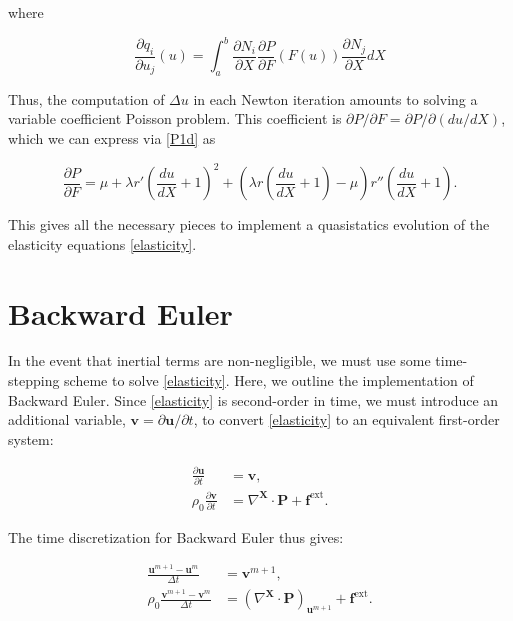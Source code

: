 \documentclass{article}
\begin{document}
where

\begin{equation}
\frac{\partial q_i}{\partial u_j} (u) = \int_a^b \frac{\partial N_i}{\partial X} \frac{\partial P}{\partial F} \left( F(u) \right) \frac{\partial N_j}{\partial X} dX
\end{equation}

Thus, the computation of \(\Delta u\) in each Newton iteration amounts to solving a variable coefficient Poisson problem.  This coefficient is \(\partial P / \partial F = \partial P / \partial \left( du/dX \right)\), which we can express via \eqref{P1d} as

\begin{equation}
\frac{\partial P}{\partial F} = \mu + \lambda r' \left( \frac{du}{dX} + 1 \right)^2 + \left( \lambda r \left( \frac{du}{dX} + 1 \right) - \mu \right) r'' \left( \frac{du}{dX} + 1 \right).
\end{equation}

This gives all the necessary pieces to implement a quasistatics evolution of the elasticity equations \eqref{elasticity}.

\section{Backward Euler}

In the event that inertial terms are non-negligible, we must use some time-stepping scheme to solve \eqref{elasticity}.  Here, we outline the implementation of Backward Euler.  Since \eqref{elasticity} is second-order in time, we must introduce an additional variable, \(\mathbf{v} = \partial \mathbf{u} / \partial t\), to convert \eqref{elasticity} to an equivalent first-order system:

\begin{equation}
\begin{split}
\frac{\partial \mathbf{u}}{\partial t} & = \mathbf{v}, \\
\rho_0 \frac{\partial \mathbf{v}}{\partial t} & = \nabla^{\mathbf{X}} \cdot \mathbf{P} + \mathbf{f}^{\text{ext}}.
\end{split}
\end{equation}

The time discretization for Backward Euler thus gives:

\begin{equation}
\begin{split}
\frac{\mathbf{u}^{m+1} - \mathbf{u}^m}{\Delta t} & = \mathbf{v}^{m+1}, \\
\rho_0 \frac{\mathbf{v}^{m+1} - \mathbf{v}^m}{\Delta t} & = \left( \nabla^{\mathbf{X}} \cdot \mathbf{P} \right)_{\mathbf{u}^{m+1}} + \mathbf{f}^{\text{ext}}.
\end{split}
\end{equation}
\end{document}
